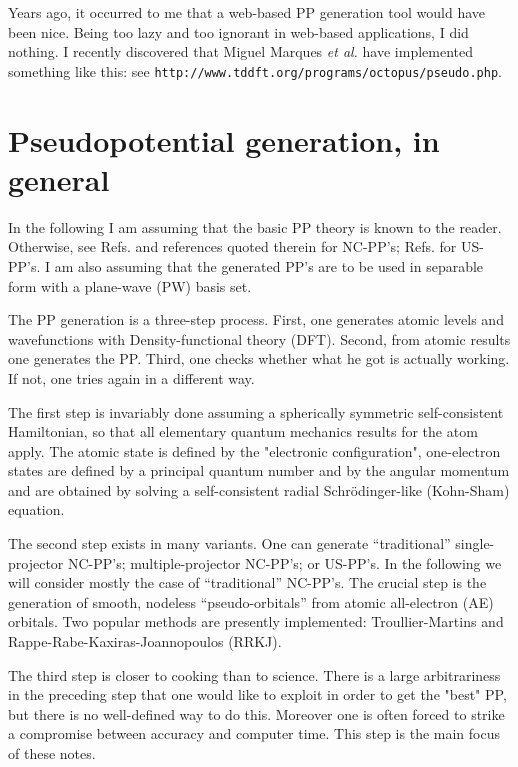 Years ago, it occurred to me that a web-based PP generation
tool would have been nice. Being too lazy and too ignorant 
in web-based applications, I did nothing.
I recently discovered that Miguel Marques {\em et al.} have
implemented something like this: see
{\tt http://www.tddft.org/programs/octopus/pseudo.php}.

\section{Pseudopotential generation, in general} 

In the following I am assuming that the basic PP theory 
is known to the reader. Otherwise, see 
Refs.\cite{NC,BHS,TM,fhi98PP,RRKJ} and references quoted 
therein for NC-PP's; Refs.\cite{van,PAW} for US-PP's. 
I am also assuming that the generated PP's are to be used
in separable form \cite{KB} with a plane-wave (PW) basis set.

The PP generation is a three-step process. First, one generates
atomic levels and wavefunctions with Density-functional theory (DFT). 
Second, from atomic results one generates the PP. Third, one checks 
whether what he got is actually working. If not, one tries again in 
a different way.

The first step is invariably done assuming a spherically symmetric
self-consistent Hamiltonian, so that all elementary quantum mechanics 
results for the atom apply. The atomic state is defined by the
"electronic configuration", one-electron states are defined by a
principal quantum number and by the angular momentum and are obtained
by solving a self-consistent radial Schr\"odinger-like (Kohn-Sham)
equation.

The second step exists in many variants. One can generate ``traditional'' 
single-projector NC-PP's; multiple-projector NC-PP's; or US-PP's.
In the following we will consider mostly the case of ``traditional'' 
NC-PP's. The crucial step is the generation of smooth, nodeless
``pseudo-orbitals'' from atomic all-electron (AE) orbitals. Two popular 
methods are presently implemented: Troullier-Martins \cite{TM}
and Rappe-Rabe-Kaxiras-Joannopoulos \cite{RRKJ} (RRKJ).

The third step is closer to cooking than to science. There is a
large arbitrariness in the preceding step that one would like to 
exploit in order to get the "best" PP, but there is no well-defined
way to do this. Moreover one is often forced to strike a compromise
between accuracy and computer time. This step is the main focus of
these notes.

